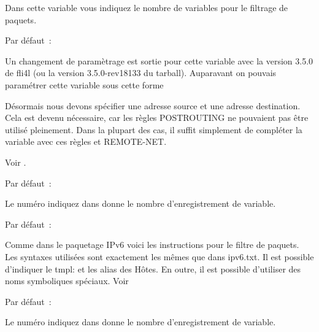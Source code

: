 \begin{description}
  Dans cette variable  vous indiquez le nombre
  de variables pour le filtrage de paquets.


  Par défaut~: 

  Un changement de paramètrage est sortie pour cette variable avec la version
  3.5.0 de fli4l (ou la version 3.5.0-rev18133 du tarball). Auparavant on
  pouvais paramétrer cette variable sous cette forme


  Désormais nous devons spécifier une adresse source et une adresse destination.
  Cela est devenu nécessaire, car les règles POSTROUTING ne pouvaient pas être
  utilisé pleinement. Dans la plupart des cas, il suffit simplement de compléter
  la variable avec ces règles  et REMOTE-NET.

  Voir .


  Par défaut~: 

 Le numéro indiquez dans  donne le nombre
 d'enregistrement de variable.


  Par défaut~: 

  Comme dans le paquetage IPv6 voici les instructions pour le filtre de paquets.
  Les syntaxes utilisées sont exactement les mêmes que dans ipv6.txt. Il est
  possible d'indiquer le tmpl: et les alias des Hôtes. En outre, il est possible
  d'utiliser des noms symboliques spéciaux.
  Voir 


  Par défaut~: 

  Le numéro indiquez dans  donne le nombre
  d'enregistrement de variable.



\end{description}
